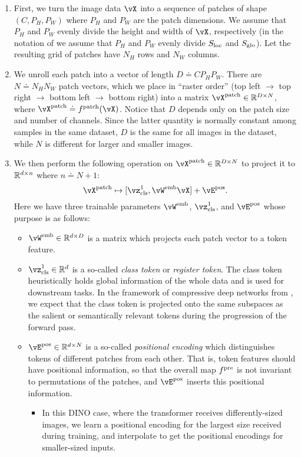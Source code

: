 \documentclass[../../book-main.tex]{subfiles}
\begin{document}
\begin{enumerate}
    \item First, we turn the image data \(\vX\) into a sequence of patches of shape \((C, P_{H}, P_{W})\) where \(P_{H}\) and \(P_{W}\) are the patch dimensions. We assume that \(P_{H}\) and \(P_{W}\) evenly divide the height and width of \(\vX\), respectively (in the notation of  we assume that \(P_{H}\) and \(P_{W}\) evenly divide \(S_{\mathrm{loc}}\) and \(S_{\mathrm{glo}}\)). Let the resulting grid of patches have \(N_{H}\) rows and \(N_{W}\) columns.
    \item We unroll each patch into a vector of length \(D \doteq CP_{H}P_{W}\). There are \(N \doteq N_{H}N_{W}\) patch vectors, which we place in ``raster order'' (top left \(\to\) top right \(\to\) bottom left \(\to\) bottom right) into a matrix \(\vX^{\patch} \in \R^{D \times N}\), where \(\vX^{\patch} \doteq f^{\patch}(\vX)\). Notice that \(D\) depends only on the patch size and number of channels. Since the latter quantity is normally constant among samples in the same dataset, \(D\) is the same for all images in the dataset, while \(N\) is different for larger and smaller images.
    \item We then perform the following operation on \(\vX^{\patch} \in \R^{D \times N}\) to project it to \(\mathbb{R}^{d \times n}\) where \(n \doteq N + 1\):
    \begin{equation}
        \vX^{\patch} \mapsto [\vz_{\cls}^{1}, \vW^{\emb}\vX] + \vE^{\pos}.
    \end{equation}
    Here we have three trainable parameters \(\vW^{\emb}\), \(\vz_{\cls}^{1}\), and \(\vE^{\pos}\) whose purpose is as follows:
    \begin{itemize}
        \item \(\vW^{\emb} \in \R^{d \times D}\) is a matrix which projects each patch vector to a token feature.
        \item \(\vz_{\cls}^{1} \in \R^{d}\) is a so-called \textit{class token} or \textit{register token}. The class token heuristically holds global information of the whole data and is used for downstream tasks. In the framework of compressive deep networks from , we expect that the class token is projected onto the same subspaces as the salient or semantically relevant tokens during the progression of the forward pass.
        \item \(\vE^{\pos} \in \R^{d \times N}\) is a so-called \textit{positional encoding} which distinguishes tokens of different patches from each other. That is, token features should have positional information, so that the overall map \(f^{\mathrm{pre}}\) is not invariant to permutations of the patches, and \(\vE^{\pos}\) inserts this positional information. 
        \begin{itemize}
            \item In this DINO case, where the transformer receives differently-sized images, we learn a positional encoding for the largest size received during training, and interpolate to get the positional encodings for smaller-sized inputs.
        \end{itemize}
    \end{itemize}
\end{enumerate}
\end{document}
